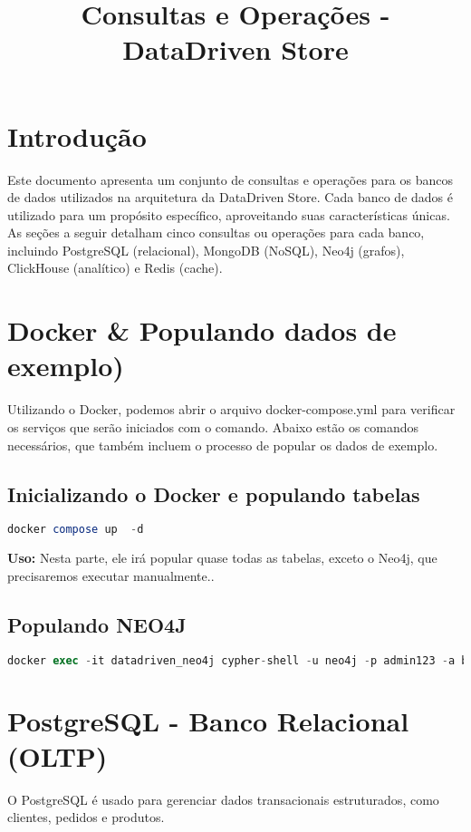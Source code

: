 \documentclass[a4paper,12pt]{article}
\title{Consultas e Operações - DataDriven Store}
\author{}
\begin{document}
\maketitle

\section{Introdução}
Este documento apresenta um conjunto de consultas e operações para os bancos de dados utilizados na arquitetura da DataDriven Store. Cada banco de dados é utilizado para um propósito específico, aproveitando suas características únicas. As seções a seguir detalham cinco consultas ou operações para cada banco, incluindo PostgreSQL (relacional), MongoDB (NoSQL), Neo4j (grafos), ClickHouse (analítico) e Redis (cache).

\section{Docker & Populando dados de exemplo)}
Utilizando o Docker, podemos abrir o arquivo docker-compose.yml para verificar os serviços que serão iniciados com o comando. Abaixo estão os comandos necessários, que também incluem o processo de popular os dados de exemplo.
\subsection{Inicializando o Docker e populando tabelas}
\begin{lstlisting}[language=SQL] docker compose up  -d 
\end{lstlisting}
\textbf{Uso:} Nesta parte, ele irá popular quase todas as tabelas, exceto o Neo4j, que precisaremos executar manualmente..

\subsection{Populando NEO4J}
\begin{lstlisting}[language=SQL]
docker exec -it datadriven_neo4j cypher-shell -u neo4j -p admin123 -a bolt://localhost:7687 -d neo4j -f /var/lib/neo4j/import/neo4j_schema.cypher
\end{lstlisting}

\section{PostgreSQL - Banco Relacional (OLTP)}
O PostgreSQL é usado para gerenciar dados transacionais estruturados, como clientes, pedidos e produtos.
\end{document}
